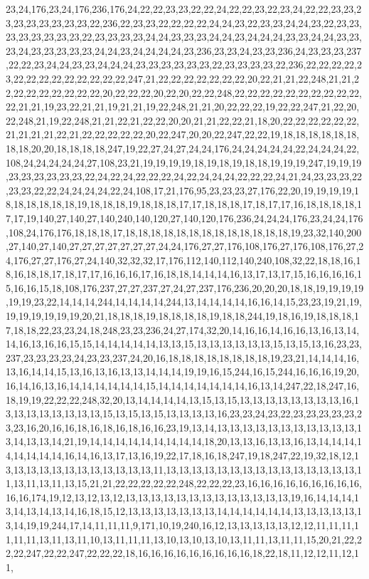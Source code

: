 23,24,176,23,24,176,236,176,24,22,22,23,23,22,22,24,22,22,23,22,23,24,22,22,23,23,23,23,23,23,23,23,23,22,236,22,23,23,22,22,22,22,24,24,23,22,23,23,24,24,23,22,23,23,23,23,23,23,23,23,22,23,23,23,23,24,24,23,23,23,24,24,23,24,24,24,23,23,24,24,23,23,23,24,23,23,23,23,23,24,24,23,24,24,24,24,23,236,23,23,24,23,23,236,24,23,23,23,237,22,22,23,24,24,23,23,24,24,24,23,23,23,23,23,23,22,23,23,23,23,22,236,22,22,22,22,23,22,22,22,22,22,22,22,22,22,247,21,22,22,22,22,22,22,22,20,22,21,21,22,248,21,21,22,22,22,22,22,22,22,22,20,22,22,22,20,22,20,22,22,248,22,22,22,22,22,22,22,22,22,22,22,21,21,19,23,22,21,21,19,21,21,19,22,248,21,21,20,22,22,22,19,22,22,247,21,22,20,22,248,21,19,22,248,21,21,22,21,22,22,20,20,21,21,22,22,21,18,20,22,22,22,22,22,22,21,21,21,21,22,21,22,22,22,22,22,20,22,247,20,20,22,247,22,22,19,18,18,18,18,18,18,18,18,20,20,18,18,18,18,247,19,22,27,24,27,24,24,176,24,24,24,24,24,22,24,24,24,22,108,24,24,24,24,24,27,108,23,21,19,19,19,19,18,19,18,19,18,18,19,19,19,247,19,19,19,23,23,23,23,23,23,22,24,22,24,22,22,22,24,22,24,24,24,22,22,22,24,21,24,23,23,23,22,23,23,22,22,24,24,24,24,22,24,108,17,21,176,95,23,23,23,27,176,22,20,19,19,19,19,18,18,18,18,18,18,19,18,18,18,19,18,18,18,17,17,18,18,18,17,18,17,17,16,18,18,18,18,17,17,19,140,27,140,27,140,240,140,120,27,140,120,176,236,24,24,24,176,23,24,24,176,108,24,176,176,18,18,18,17,18,18,18,18,18,18,18,18,18,18,18,18,18,19,23,32,140,200,27,140,27,140,27,27,27,27,27,27,27,24,24,176,27,27,176,108,176,27,176,108,176,27,24,176,27,27,176,27,24,140,32,32,32,17,176,112,140,112,140,240,108,32,22,18,18,16,18,16,18,18,17,18,17,17,16,16,16,17,16,18,18,14,14,14,16,13,17,13,17,15,16,16,16,16,15,16,16,15,18,108,176,237,27,27,237,27,24,27,237,176,236,20,20,20,18,18,19,19,19,19,19,19,23,22,14,14,14,244,14,14,14,14,244,13,14,14,14,14,16,16,14,15,23,23,19,21,19,19,19,19,19,19,19,20,21,18,18,18,19,18,18,18,18,19,18,18,244,19,18,16,19,18,18,18,17,18,18,22,23,23,24,18,248,23,23,236,24,27,174,32,20,14,16,16,14,16,16,13,16,13,14,14,16,13,16,16,15,15,14,14,14,14,14,13,13,15,13,13,13,13,13,13,15,13,15,13,16,23,23,237,23,23,23,23,24,23,23,237,24,20,16,18,18,18,18,18,18,18,18,19,23,21,14,14,14,16,13,16,14,14,15,13,16,13,16,13,13,14,14,14,19,19,16,15,244,16,15,244,16,16,16,19,20,16,14,16,13,16,14,14,14,14,14,14,15,14,14,14,14,14,14,14,16,13,14,247,22,18,247,16,18,19,19,22,22,22,248,32,20,13,14,14,14,14,13,15,13,15,13,13,13,13,13,13,13,13,16,13,13,13,13,13,13,13,13,15,13,15,13,15,13,13,13,13,16,23,23,24,23,22,23,23,23,23,23,23,23,16,20,16,16,18,16,18,16,18,16,16,23,19,13,14,13,13,13,13,13,13,13,13,13,13,13,13,14,13,13,14,21,19,14,14,14,14,14,14,14,14,14,18,20,13,13,16,13,13,16,13,14,14,14,14,14,14,14,14,16,14,16,13,17,13,16,19,22,17,18,16,18,247,19,18,247,22,19,32,18,12,13,13,13,13,13,13,13,13,13,13,13,13,11,13,13,13,13,13,13,13,13,13,13,13,13,13,13,13,11,13,11,13,11,13,15,21,21,22,22,22,22,22,248,22,22,22,23,16,16,16,16,16,16,16,16,16,16,16,174,19,12,13,12,13,12,13,13,13,13,13,13,13,13,13,13,13,13,13,19,16,14,14,14,13,14,13,14,13,14,16,18,15,12,13,13,13,13,13,13,13,14,14,14,14,14,14,13,13,13,13,13,13,14,19,19,244,17,14,11,11,11,9,171,10,19,240,16,12,13,13,13,13,13,12,12,11,11,11,11,11,11,13,11,13,11,10,13,11,11,11,13,10,13,10,13,10,13,11,11,13,11,11,15,20,21,22,22,22,247,22,22,247,22,22,22,18,16,16,16,16,16,16,16,16,16,18,22,18,11,12,12,11,12,11,